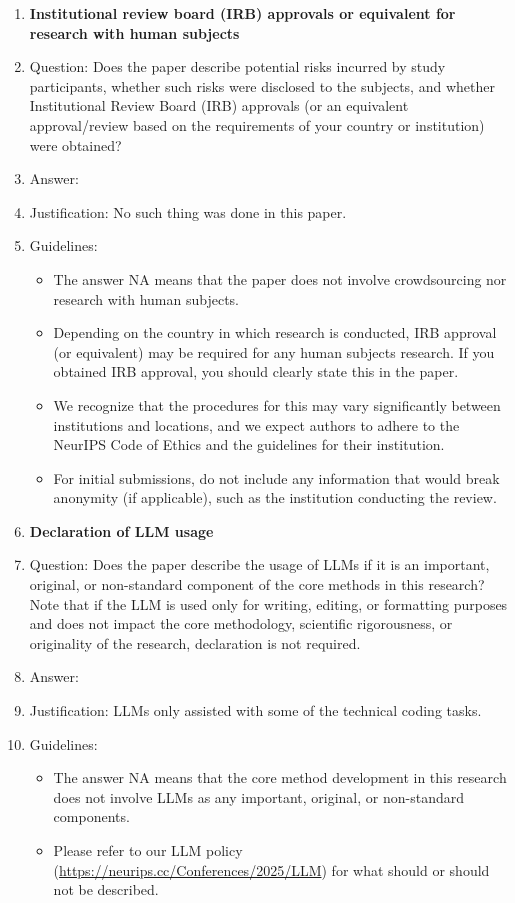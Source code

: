 \documentclass{article}
\theoremstyle{plain}
\theoremstyle{definition}
\begin{document}
\begin{enumerate}
\item {\bf Institutional review board (IRB) approvals or equivalent for research with human subjects}
    \item[] Question: Does the paper describe potential risks incurred by study participants, whether such risks were disclosed to the subjects, and whether Institutional Review Board (IRB) approvals (or an equivalent approval/review based on the requirements of your country or institution) were obtained?
    \item[] Answer: \answerNA{} 
    \item[] Justification:  No such thing was done in this paper.
    \item[] Guidelines:
    \begin{itemize}
        \item The answer NA means that the paper does not involve crowdsourcing nor research with human subjects.
        \item Depending on the country in which research is conducted, IRB approval (or equivalent) may be required for any human subjects research. If you obtained IRB approval, you should clearly state this in the paper. 
        \item We recognize that the procedures for this may vary significantly between institutions and locations, and we expect authors to adhere to the NeurIPS Code of Ethics and the guidelines for their institution. 
        \item For initial submissions, do not include any information that would break anonymity (if applicable), such as the institution conducting the review.
    \end{itemize}

\item {\bf Declaration of LLM usage}
    \item[] Question: Does the paper describe the usage of LLMs if it is an important, original, or non-standard component of the core methods in this research? Note that if the LLM is used only for writing, editing, or formatting purposes and does not impact the core methodology, scientific rigorousness, or originality of the research, declaration is not required.
    \item[] Answer: \answerNA{} 
    \item[] Justification: LLMs only assisted with some of the technical coding tasks.
    \item[] Guidelines:
    \begin{itemize}
        \item The answer NA means that the core method development in this research does not involve LLMs as any important, original, or non-standard components.
        \item Please refer to our LLM policy (\url{https://neurips.cc/Conferences/2025/LLM}) for what should or should not be described.
    \end{itemize}

\end{enumerate}
\fi
\end{document}
